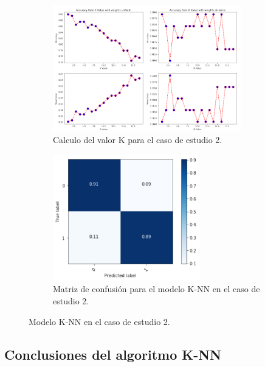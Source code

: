 \paragraph{}
\begin{figure}[!htb]
    \begin{subfigure}[b]{0.45\linewidth}
    	\centering
	    \includegraphics[width=0.9\textwidth]{images/resultados_knn_ent_conjunto2.png}
    	\caption{Calculo del valor K para el caso de estudio 2.}
		\label{knnTrainCase2}
	\end{subfigure}
	\begin{subfigure}[b]{0.45\linewidth} 
		\centering
		\includegraphics[width=0.7\textwidth]{images/resultados_knn_cm_conjunto2.png}
		\caption{Matriz de confusión para el modelo K-NN en el caso de estudio 2.}
		\label{knnCMCase2}
	\end{subfigure}
	\caption{Modelo K-NN en el caso de estudio 2.}
	\label{knnCase1}
\end{figure}

\subsection{Conclusiones del algoritmo K-NN}
\label{resultados:knn_conclusiones}

